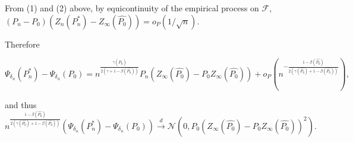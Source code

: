 \documentclass[a4paper]{article}
\begin{document}
From (1) and (2) above, by equicontinuity of the empirical process on $\mathcal{F}$, $(P_n - P_0)(Z_n(P_n^*) - Z_\infty(\hat{P_0})) = o_P(1 / \sqrt{n})$.

Therefore

$$\Psi_{\delta_n}(P_n^*) - \Psi_{\delta_n}(P_0) = n^{\frac{\gamma(\hat{P_0})}{2(\gamma + 1 -\beta(\hat{P_0}))}} P_n \left( Z_\infty(\hat{P_0}) - P_0 Z_\infty(\hat{P_0})\right) + o_P\left(n^{-\frac{1 - \beta(\hat{P_0})}{2 (\gamma(\hat{P_0}) + 1 - \beta(\hat{P_0}))}}\right),$$

and thus 
$$n^{\frac{1 - \beta(\hat{P_0})}{2 (\gamma(\hat{P_0}) + 1 - \beta(\hat{P_0}))}}\left( \Psi_{\delta_n}(P_n^*) - \Psi_{\delta_n}(P_0) \right) \xrightarrow{d} \mathcal{N}\left(0, P_0\left( Z_\infty(\hat{P_0}) - P_0 Z_\infty(\hat{P_0})\right)^2\right).$$

\end{document}
